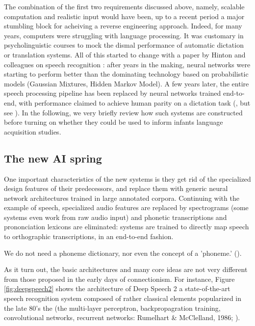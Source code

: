 \documentclass[jou,apacite]{apa6}
\begin{document}
The combination of the first two requirements discussed above, namely, scalable computation and realistic input would have been, up to a recent period a major stumbling block for acheiving a reverse engineering approach.  Indeed, for many years, computers were struggling with language processing. It was customary in psycholinguistic courses to mock the dismal performance of automatic dictation or translation systems. All of this started to change with a paper by Hinton and colleagues on speech recognition \cite{hinton_2012}: after years in the making, neural networks were starting to perform better than the dominating technology based on probabilistic models (Gaussian Mixtures, Hidden Markov Model). A few years later, the entire speech processing pipeline has been replaced by neural networks trained end-to-end, with performance claimed to achieve human parity on a dictation task (, but see ). In the following, we very briefly review how such systems are constructed before turning on whether they could be used to inform infants language acquisition studies.


\subsection{The new AI spring}


One important characteristics of the new systems is they get rid of the specialized design features of their predecessors, and replace them with generic neural network architectures trained in large annotated corpora. Continuing with the example of speech, specialized audio features are replaced by spectrograms (some systems even work from raw audio input) and phonetic transcriptions and prononciation lexicons are eliminated: systems are trained to directly map speech to orthographic transcriptions, in an end-to-end fashion.%

\begin{displayquote}
We do not need a phoneme dictionary, nor even the concept of a 'phoneme.'
 (). 
\end{displayquote}


As it turn out, the basic architectures and many core ideas are not very different from those proposed in the early days of connectionism. For instance, Figure \ref{fig:deepspeech2} shows the architecture of Deep Speech 2 \cite{amodei16} a state-of-the-art speech recognition system composed of rather classical elements popularized in the late 80's the (the multi-layer perceptron, backpropagration training, convolutional networks, recurrent networks: Rumelhart \& McClelland, 1986; ).
\end{document}
